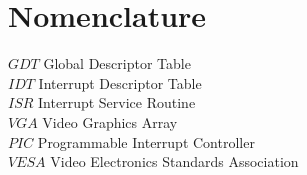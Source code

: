 \section*{\centering Nomenclature}
\vspace{1.5 cm}

\begin{flushleft}
	

$GDT$   \hspace{1.0 cm} Global Descriptor Table\\
$IDT$   \hspace{1.0 cm} Interrupt Descriptor Table\\
$ISR$   \hspace{1.0 cm} Interrupt Service Routine\\
$VGA$   \hspace{1.0 cm} Video Graphics Array\\
$PIC$   \hspace{1.0 cm} Programmable Interrupt Controller\\
$VESA$ \hspace{1.0 cm}Video Electronics Standards Association\\



\end{flushleft}